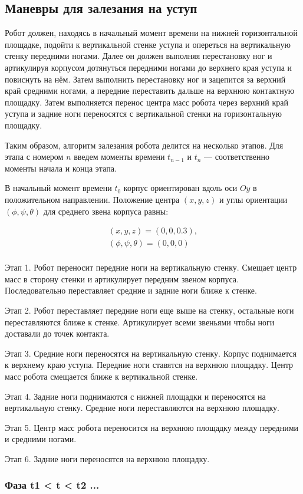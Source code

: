 \subsection{Маневры для залезания на уступ}

Робот должен, находясь в начальный момент времени на нижней горизонтальной площадке, подойти к вертикальной стенке уступа и опереться на вертикальную стенку передними ногами. Далее он должен выполняя перестановку ног и артикулируя корпусом дотянуться передними ногами до верхнего края уступа и повиснуть на нём. Затем выполнить перестановку ног и зацепится за верхний край средними ногами, а передние переставить дальше на верхнюю контактную площадку. Затем выполняется перенос центра масс робота через верхний край уступа и задние ноги переносятся с вертикальной стенки на горизонтальную площадку.

Таким образом, алгоритм залезания робота делится на несколько этапов. Для этапа с номером $n$ введем моменты времени $t_{n-1}$ и $t_n$ --- соответственно моменты начала и конца этапа.

В начальный момент времени $t_0$ корпус ориентирован вдоль оси $Oy$ в положительном направлении. Положение центра $(x,y,z)$ и углы ориентации $(\phi,\psi,\theta)$ для среднего звена корпуса равны:

\begin{equation}
  \begin{alignedat}{2}
    (x,y,z) = (0,0,0.3),\\
    (\phi,\psi,\theta) = (0,0,0)\\
  \end{alignedat}
\end{equation}


Этап 1. Робот переносит передние ноги на вертикальную стенку. Смещает центр масс в сторону стенки и артикулирует передним звеном корпуса. Последовательно переставляет средние и задние ноги ближе к стенке.

Этап 2. Робот переставляет передние ноги еще выше на стенку, остальные ноги переставляются ближе к стенке. Артикулирует всеми звеньями чтобы ноги доставали до точек контакта.

Этап 3. Средние ноги переносятся на вертикальную стенку. Корпус поднимается к верхнему краю уступа. Передние ноги ставятся на верхнюю площадку. Центр масс робота смещается ближе к вертикальной стенке.

Этап 4. Задние ноги поднимаются с нижней площадки и переносятся на вертикальную стенку. Средние ноги переставляются на верхнюю площадку.

Этап 5. Центр масс робота переносится на верхнюю площадку между передними и средними ногами.

Этап 6. Задние ноги переносятся на верхнюю площадку.





\subsubsection{Фаза t1 < t < t2 ...}



